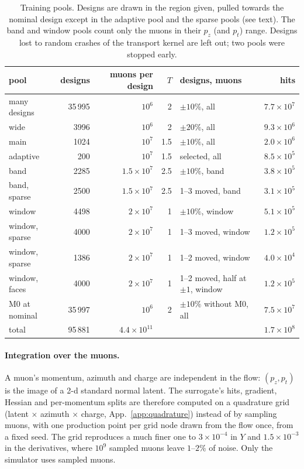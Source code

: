 \documentclass[11pt,a4paper]{article}
\begin{document}
\begin{table}[h]
\centering
\caption{Training pools. Designs are drawn in the region given, pulled towards the nominal
design except in the adaptive pool and the sparse pools (see text). The band and window pools
count only the muons in their $p_z$ (and $p_t$) range. Designs lost to random crashes of the
transport kernel are left out; two pools were stopped early.}
\label{tab:pools}
\small
\begin{tabular}{lrrrlr}
\toprule
pool & designs & muons per design & $T$ & designs, muons & hits \\
\midrule
many designs     & 35\,995 & $10^6$             & 2   & $\pm10\%$, all            & $7.7\times10^7$ \\
wide             & 3996    & $10^6$             & 2   & $\pm20\%$, all            & $9.3\times10^6$ \\
main             & 1024    & $10^7$             & 1.5 & $\pm10\%$, all            & $2.0\times10^6$ \\
adaptive         & 200     & $10^7$             & 1.5 & selected, all             & $8.5\times10^5$ \\
band             & 2285    & $1.5\times10^7$    & 2.5 & $\pm10\%$, band           & $3.8\times10^5$ \\
band, sparse     & 2500    & $1.5\times10^7$    & 2.5 & 1--3 moved, band          & $3.1\times10^5$ \\
window           & 4498    & $2\times10^7$      & 1   & $\pm10\%$, window         & $5.1\times10^5$ \\
window, sparse   & 4000    & $2\times10^7$      & 1   & 1--3 moved, window        & $1.2\times10^5$ \\
window, sparse   & 1386    & $2\times10^7$      & 1   & 1--2 moved, window        & $4.0\times10^4$ \\
window, faces    & 4000    & $2\times10^7$      & 1   & 1--2 moved, half at $\pm1$, window & $1.2\times10^5$ \\
M0 at nominal    & 35\,997 & $10^6$             & 2   & $\pm10\%$ without M0, all & $7.5\times10^7$ \\
\midrule
total            & 95\,881 & $4.4\times10^{11}$ & & & $1.7\times10^8$ \\
\bottomrule
\end{tabular}
\end{table}

\paragraph{Integration over the muons.}
A muon's momentum, azimuth and charge are independent in the flow: $(p_z,p_t)$ is the image of a
2-d standard normal latent. The surrogate's hits, gradient, Hessian and per-momentum splits are
therefore computed on a quadrature grid (latent $\times$ azimuth $\times$ charge,
App.~\ref{app:quadrature}) instead of by sampling muons, with one production point per grid node
drawn from the flow once, from a fixed seed. The grid reproduces a much finer one to
$3\times10^{-4}$ in $Y$ and $1.5\times10^{-3}$ in the derivatives, where $10^9$ sampled muons leave
$1$--$2\%$ of noise. Only the simulator uses sampled muons.
\end{document}
